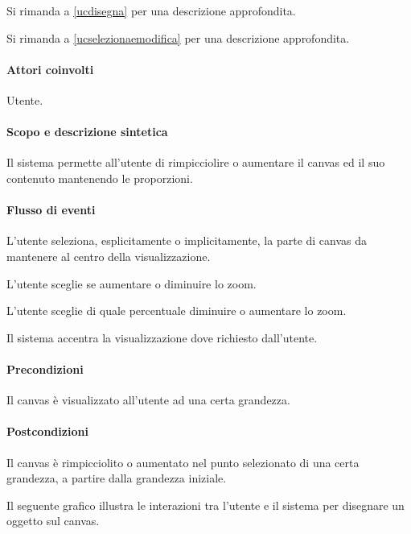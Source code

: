 Si rimanda a \ref{ucdisegna} per una descrizione approfondita.

Si rimanda a \ref{ucselezionaemodifica} per una descrizione approfondita.

\paragraph{Attori coinvolti} Utente.
\paragraph{Scopo e descrizione sintetica} 
Il sistema permette all'utente di rimpicciolire o aumentare il canvas ed il suo contenuto mantenendo le proporzioni.
\paragraph{Flusso di eventi}
\begin{elenconumerato}[\textbf{}]{\subsubsecindent}
\item L'utente seleziona, esplicitamente o implicitamente, la parte di canvas da mantenere al centro della visualizzazione.
\item L'utente sceglie se aumentare o diminuire lo zoom.
\item L'utente sceglie di quale percentuale diminuire o aumentare lo zoom.
\item Il sistema accentra la visualizzazione dove richiesto dall'utente.
\end{elenconumerato}
\paragraph{Precondizioni} Il canvas \`e visualizzato all'utente ad una certa grandezza.
\paragraph{Postcondizioni} Il canvas \`e rimpicciolito o aumentato nel punto selezionato di una certa grandezza, a partire dalla grandezza iniziale.
\newpage

\label{ucdisegna}
Il seguente grafico illustra le interazioni tra l'utente e il sistema per disegnare un oggetto sul canvas.

